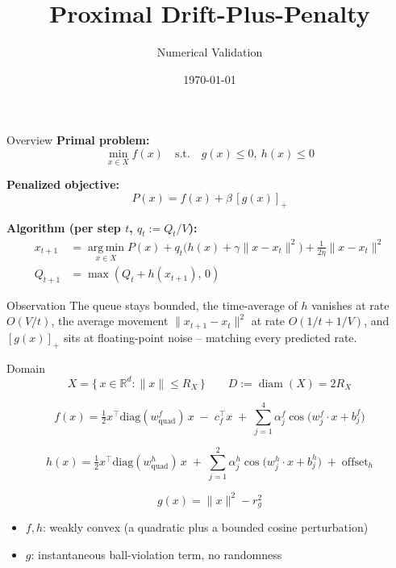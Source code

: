 \documentclass{beamer}
\title{Proximal Drift-Plus-Penalty}
\subtitle{Numerical Validation}
\author{}
\date{\today}
\begin{document}
\begin{frame}
  \titlepage
\end{frame}

\begin{frame}{Overview}
  \small
  \textbf{Primal problem:}
  \[
    \min_{x \in X} f(x) \quad \text{s.t.} \quad g(x) \le 0,\ h(x) \le 0
  \]

  \textbf{Penalized objective:}
  \[
    P(x) = f(x) + \beta\,[g(x)]_+
  \]

  \textbf{Algorithm (per step $t$, $q_t := Q_t/V$):}
  \begin{align*}
    x_{t+1} &= \operatorname*{arg\,min}_{x \in X} P(x) + q_t\big(h(x)+\gamma\|x-x_t\|^2\big) + \tfrac{1}{2\eta}\|x-x_t\|^2 \\
    Q_{t+1} &= \max(Q_t + h(x_{t+1}),\,0)
  \end{align*}

  \vspace{0.5em}
  \begin{block}{Observation}
    \small The queue stays bounded, the time-average of $h$ vanishes at rate $O(V/t)$, the average movement $\|x_{t+1}-x_t\|^2$ at rate $O(1/t+1/V)$, and $[g(x)]_+$ sits at floating-point noise -- matching every predicted rate.
  \end{block}
\end{frame}

\begin{frame}{Domain}
  \[
    X = \{\, x \in \mathbb{R}^d : \|x\| \le R_X \,\} \qquad D := \operatorname{diam}(X) = 2R_X
  \]

  \[
    f(x) = \tfrac{1}{2} x^\top \mathrm{diag}(w^f_{\mathrm{quad}})\, x \;-\; c_f^\top x \;+\; \sum_{j=1}^{4} \alpha^f_j \cos\big(w^f_j \cdot x + b^f_j\big)
  \]

  \[
    h(x) = \tfrac{1}{2} x^\top \mathrm{diag}(w^h_{\mathrm{quad}})\, x \;+\; \sum_{j=1}^{2} \alpha^h_j \cos\big(w^h_j \cdot x + b^h_j\big) \;+\; \text{offset}_h
  \]

  \[
    g(x) = \|x\|^2 - r_g^2
  \]

  \begin{itemize}
    \item $f, h$: weakly convex (a quadratic plus a bounded cosine perturbation)
    \item $g$: instantaneous ball-violation term, no randomness
  \end{itemize}
\end{frame}
\end{document}
